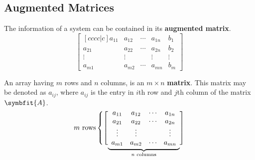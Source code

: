 \documentclass{article}
\begin{document}
\subsection{Augmented Matrices}
\begin{definition}
    The information of a system can be contained in its
    \textbf{augmented matrix}.
    \begin{equation*}
        \begin{bmatrix}[cccc|c]
            a_{11} & a_{12} & \cdots & a_{1n} & b_1    \\
            a_{21} & a_{22} & \cdots & a_{2n} & b_2    \\
            \vdots & \vdots &        & \vdots & \vdots \\
            a_{m1} & a_{m2} & \cdots & a_{mn} & b_m
        \end{bmatrix}
    \end{equation*}
\end{definition}
\begin{definition}
    An array having \(m\) rows and \(n\) columns, is an \(m \times n\)
    \textbf{matrix}. This matrix may be denoted as \(a_{ij}\), where
    \(a_{ij}\) is the entry in \(i\)th row and \(j\)th column of the
    matrix \(\symbfit{A}\).
    \begin{equation*}
        \text{\(m\) rows}
        \left\{
        \left[
        \vphantom{\begin{array}{c} 1 \\ 1 \\ 1 \\ 1 \end{array}}
        \smash{\underbrace{
            \begin{array}{cccc}
                a_{11} & a_{12} & \cdots & a_{1n} \\
                a_{21} & a_{22} & \cdots & a_{2n} \\
                \vdots & \vdots &        & \vdots \\
                a_{m1} & a_{m2} & \cdots & a_{mn}
            \end{array}
        }_{\text{\(n\) columns}}}
        \right]
        \right.
    \end{equation*}
\end{definition}
\end{document}
